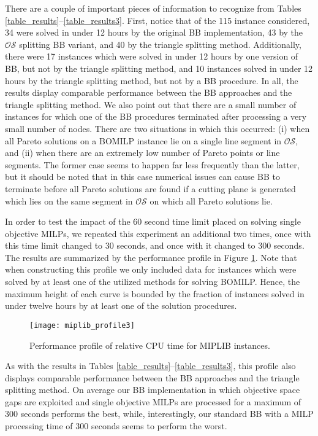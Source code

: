 \documentclass[11.5pt]{article}
\newcommand{\OS}{\mathcal{OS}}
\begin{document}

There are a couple of important pieces of information to recognize from Tables \ref{table_results}--\ref{table_results3}. First, notice that of the 115 instance considered, 34 were solved in under 12 hours by the original BB implementation, 43 by the $\OS$ splitting BB variant, and 40 by the triangle splitting method. Additionally, there were 17 instances which were solved in under 12 hours by one version of BB, but not by the triangle splitting method, and 10 instances solved in under 12 hours by the triangle splitting method, but not by a BB procedure. In all, the results display comparable performance between the BB approaches and the triangle splitting method. We also point out that there are a small number of instances for which one of the BB procedures terminated after processing a very small number of nodes. There are two situations in which this occurred: (i) when all Pareto solutions on a BOMILP instance lie on a single line segment in $\OS$, and (ii) when there are an extremely low number of Pareto points or line segments. The former case seems to happen far less frequently than the latter, but it should be noted that in this case numerical issues can cause BB to terminate before all Pareto solutions are found if a cutting plane is generated which lies on the same segment in $\OS$ on which all Pareto solutions lie.

In order to test the impact of the 60 second time limit placed on solving single objective MILPs, we repeated this experiment an additional two times, once with this time limit changed to 30 seconds, and once with it changed to 300 seconds. The results are summarized by the performance profile in Figure \ref{MIPLIB_perf_prof}. Note that when constructing this profile we only included data for instances which were solved by at least one of the utilized methods for solving BOMILP. Hence, the maximum height of each curve is bounded by the fraction of instances solved in under twelve hours by at least one of the solution procedures.
\begin{figure}[h!]
\centering
\texttt{[image: miplib\_profile3]}
\caption{Performance profile of relative CPU time for MIPLIB instances.}
\label{MIPLIB_perf_prof}
\end{figure}
As with the results in Tables \ref{table_results}--\ref{table_results3}, this profile also displays comparable performance between the BB approaches and the triangle splitting method. On average our BB implementation in which objective space gaps are exploited and single objective MILPs are processed for a maximum of 300 seconds performs the best, while, interestingly, our standard BB with a MILP processing time of 300 seconds seems to perform the worst. 
\end{document}
